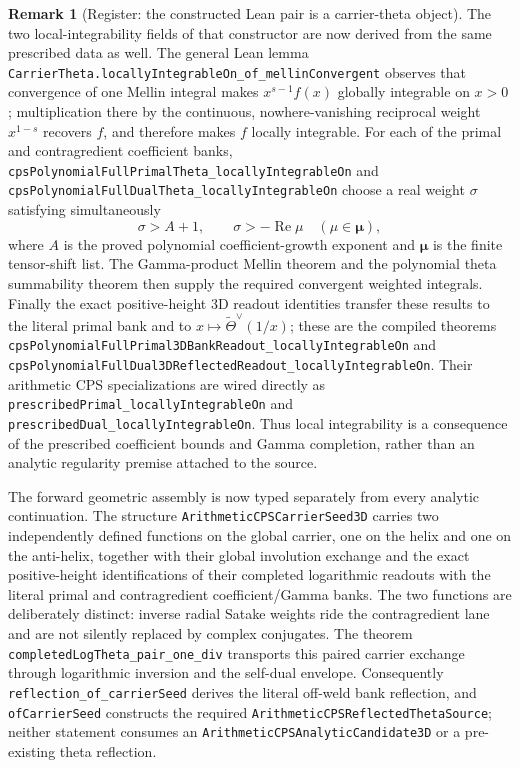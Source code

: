 \documentclass[11pt]{article}
\theoremstyle{definition}
\newtheorem{remark}[theorem]{Remark}
\renewcommand{\Re}{\operatorname{Re}}
\begin{document}
\begin{remark}[Register: the constructed Lean pair is a carrier-theta object]
The two local-integrability fields of that constructor are now derived from the same prescribed
data as well.  The general Lean lemma
\texttt{CarrierTheta.locallyIntegrableOn\_of\_mellinConvergent} observes that convergence of
one Mellin integral makes $x^{s-1}f(x)$ globally integrable on $x>0$; multiplication there by the
continuous, nowhere-vanishing reciprocal weight $x^{1-s}$ recovers $f$, and therefore makes $f$
locally integrable.  For each of the primal and contragredient coefficient banks,
\texttt{cpsPolynomialFullPrimalTheta\_locallyIntegrableOn} and
\texttt{cpsPolynomialFullDualTheta\_locallyIntegrableOn} choose a real weight $\sigma$ satisfying
simultaneously
\[
  \sigma>A+1,
  \qquad \sigma> -\Re\mu \quad(\mu\in\boldsymbol\mu),
\]
where $A$ is the proved polynomial coefficient-growth exponent and $\boldsymbol\mu$ is the finite
tensor-shift list.  The Gamma-product Mellin theorem and the polynomial theta summability theorem
then supply the required convergent weighted integrals.  Finally the exact positive-height 3D
readout identities transfer these results to the literal primal bank and to
$x\mapsto\widetilde\Theta^\vee(1/x)$; these are the compiled theorems
\texttt{cpsPolynomialFullPrimal3DBankReadout\_locallyIntegrableOn} and
\texttt{cpsPolynomialFullDual3DReflectedReadout\_locallyIntegrableOn}.  Their arithmetic CPS
specializations are wired directly as
\texttt{prescribedPrimal\_locallyIntegrableOn} and
\texttt{prescribedDual\_locallyIntegrableOn}.  Thus local integrability is a consequence of the
prescribed coefficient bounds and Gamma completion, rather than an analytic regularity premise
attached to the source.

The forward geometric assembly is now typed separately from every analytic continuation.  The
structure \texttt{ArithmeticCPSCarrierSeed3D} carries two independently defined functions on the
global carrier, one on the helix and one on the anti-helix, together with their global involution
exchange and the exact positive-height identifications of their completed logarithmic readouts with
the literal primal and contragredient coefficient/Gamma banks.  The two functions are deliberately
distinct: inverse radial Satake weights ride the contragredient lane and are not silently replaced by
complex conjugates.  The theorem \texttt{completedLogTheta\_pair\_one\_div} transports this paired
carrier exchange through logarithmic inversion and the self-dual envelope.  Consequently
\texttt{reflection\_of\_carrierSeed} derives the literal off-weld bank reflection, and
\texttt{ofCarrierSeed} constructs the required \texttt{ArithmeticCPSReflectedThetaSource}; neither
statement consumes an \texttt{ArithmeticCPSAnalyticCandidate3D} or a pre-existing theta reflection.


\end{remark}
\end{document}
